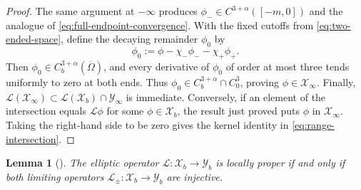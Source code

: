 \documentclass[12pt,letterpaper]{amsart}
\newtheorem{lemma}[theorem]{Lemma}
\numberwithin{equation}{section}
\begin{document}
\begin{proof}
		The same argument at \(-\infty\) produces
		\(\phi_-\in C^{3+\alpha}([-m,0])\) and the analogue of
		\eqref{eq:full-endpoint-convergence}. With the fixed cutoffs from
		{\eqref{eq:two-ended-space}, define the decaying remainder $\phi_0$ by}
		\[
		\phi_0:=\phi-\chi_-\phi_- -\chi_+\phi_+.
		\]
		Then \(\phi_0\in C_b^{3+\alpha}(\overline\Omega)\), and every derivative of
		\(\phi_0\) of order at most three tends uniformly to zero at both ends.
		Thus \(\phi_0\in C_b^{3+\alpha}\cap C_0^3\), proving
		\(\phi\in\mathscr X_\infty\).
		Finally,
		\(\mathscr L(\mathscr X_\infty)\subset\mathscr L(\mathscr X_b)\cap\mathscr Y_\infty\) is
		immediate.  Conversely, if an element of the intersection equals
		\(\mathscr L\phi\) for some \(\phi\in\mathscr X_b\), the result just proved puts
		\(\phi\) in \(\mathscr X_\infty\).  Taking the right-hand side to be zero gives the
		kernel identity in \eqref{eq:range-intersection}.	
	\end{proof}
	
	  \begin{lemma}[\cite{ChenWalshWheelerFronts,vol}]\label{lem:citelemmaa3}
	  {The elliptic operator $\mathscr L:\mathscr X_b\to\mathscr Y_b$ is locally proper if and only if both limiting operators $\mathscr L_\pm:\mathscr X_b\to\mathscr Y_b$ are injective.}
	  \end{lemma}
	
	
	
\end{document}
